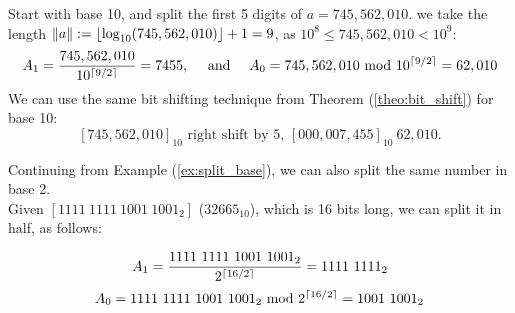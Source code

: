 \begin{Example}

\label{ex:split_base}

\vspace{-1em}
Start with base 10, and split the first 5 digits of $a=745,562,010$.
we take the length $\|a\|:=\lfloor\log_{10}(745,562,010)\rfloor+1=9$, as $10^8\leq 745,562,010<10^9$:
\[ A_1=\frac{745,562,010}{10^{\lceil9/2\rceil}}=7455, \quad \text{ and } \quad A_0=745,562,010 \text{ mod } 10^{\lceil9/2\rceil}=62,010 \]
\noindent
We can use the same bit shifting technique from Theorem (\ref{theo:bit_shift}) for base 10:
$$[745,562,010]_{10} \text{ right shift by 5, } [000,007,455]_{10}\ 62,010.$$ 
\end{Example}

\begin{Example}

\label{ex:split_base2}

\vspace{-1em}
Continuing from Example (\ref{ex:split_base}), we can also split the same number in base 2.\\
Given $[1111\ 1111\ 1001\ 1001_2]$ ($32665_{10}$), which is 16 bits long, we can split it in half, as follows:

\[ 
A_1=\frac{1111\ 1111\ 1001\ 1001_2}{2^{\ceil{16/2}}}=1111\ 1111_2
\]
\[A_0=1111\ 1111\ 1001\ 1001_2 \text{ mod } 2^{\lceil16/2\rceil}=1001\ 1001_2 \]

\vspace{-2em}
\end{Example}


\noindent


